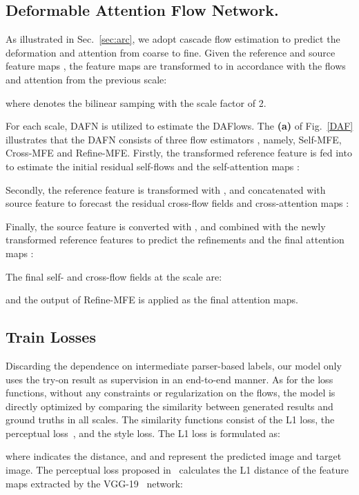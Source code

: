 \documentclass[runningheads]{llncs}
\begin{document}
\subsection{Deformable Attention Flow Network.}
As illustrated in Sec.~\ref{sec:arc}, we adopt cascade flow estimation to predict the deformation and attention from coarse to fine. Given the reference and source feature maps , the feature maps are transformed to  in accordance with the flows   and attention  from the previous scale:

where  denotes the bilinear samping with the scale factor of 2.

 For each scale, DAFN is utilized to estimate the DAFlows. The \textbf{(a)} of Fig.~\ref{DAF} illustrates that the DAFN consists of three flow estimators , namely, Self-MFE, Cross-MFE and Refine-MFE. 
Firstly, the transformed reference feature  is fed into  to estimate the initial residual self-flows and the self-attention maps :

Secondly, the reference feature is transformed with , and concatenated with source feature  to forecast the residual cross-flow fields and cross-attention maps : 


Finally, the source feature is converted with , and combined with the newly transformed reference features to predict the refinements  and the final attention maps :

The final self- and cross-flow fields at the  scale are:


and the output  of Refine-MFE is applied as the final attention maps.





\subsection{Train Losses}
Discarding the dependence on intermediate parser-based labels, our model only uses the try-on result as supervision in an end-to-end manner. As for the loss functions, without any constraints or regularization on the flows, the model is directly optimized by comparing the similarity between generated results and ground truths in all scales. The similarity functions consist of the L1 loss, the perceptual loss~\cite{johnson2016perceptual}, and the style loss.
The L1 loss is formulated as:

where  indicates the  distance, and  and  represent the predicted image and target image. The perceptual loss proposed in~\cite{johnson2016perceptual} calculates the L1 distance of the feature maps extracted by the VGG-19~\cite{vgg} network:
 
\end{document}
